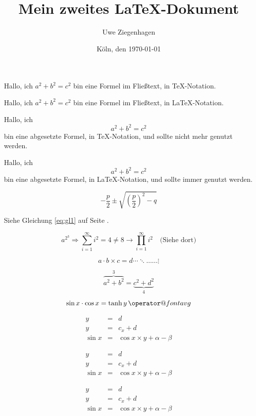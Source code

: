\documentclass[12pt,ngerman,parskip=half]{scrartcl}
\author{Uwe Ziegenhagen}
\title{Mein zweites \LaTeX-Dokument}
\date{Köln, den \today}
\makeatletter
\newcommand{\avg}{\mathop{\operator@font avg}}
\makeatother
\begin{document}
Hallo, ich $a^2+b^2=c^2$ bin eine Formel im Fließtext, in \TeX-Notation.

Hallo, ich \(a^2+b^2=c^2\) bin eine Formel im Fließtext, in \LaTeX-Notation.

Hallo, ich $$a^2+b^2=c^2$$ bin eine abgesetzte Formel, in \TeX-Notation, und sollte nicht mehr genutzt werden.

Hallo, ich \[a^2+b^2=c^2\] bin eine abgesetzte Formel, in \LaTeX-Notation, und sollte immer genutzt werden.

\begin{equation}\label{eq:gl1}%
-\frac{p}{2} \pm \sqrt{
\left(\frac{p}{2}\right)
^2 - q}
\end{equation}

Siehe Gleichung \ref{eq:gl1} auf Seite \pageref{eq:gl1}.

\begin{equation}
a^{2^3} \Rightarrow \sum_{i=1}^{\infty} i^2 = 4 \not=8 \rightarrow \prod_{i=1}^{\infty} i^2 \quad\mbox{(Siehe dort)}
\end{equation}


\begin{equation}
a \cdot b \times c = d \cdots \ddots \ldots \dots \vdots
\end{equation}

\begin{equation}
\overbrace{a^2+b^2}^3 = \underbrace{c^2 + d^2}_4
\end{equation}

\begin{equation}
\sin x \cdot \cos x = \tanh y \avg
\end{equation}

\begin{eqnarray}
y &=& d \\
y &=& c_x +d \\
\sin x &=& \cos x \times y + \alpha - \beta
\end{eqnarray}

\begin{eqnarray*}
y &=& d \\
y &=& c_x +d \\
\sin x &=& \cos x \times y + \alpha - \beta
\end{eqnarray*}

\[
\begin{array}{lcr}
y &=& d \\
y &=& c_x +d \\
\sin x &=& \cos x \times y + \alpha - \beta
\end{array}
\]
\end{document}
